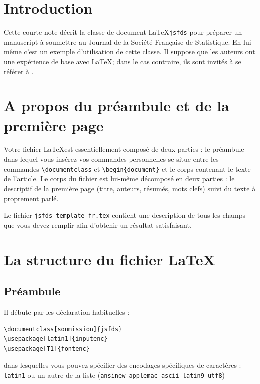 \documentclass[soumission]{jsfds}
\begin{document}
\begin{frontmatter}
  \begin{motscles}
  \end{motscles}

  \begin{motsclesalter}
  \end{motsclesalter}
  
  \begin{AMSclass}
  \end{AMSclass}
 
\end{frontmatter}
\section{Introduction}
Cette courte note décrit la classe de document \LaTeX \texttt{jsfds} pour préparer un manuscript à soumettre au Journal de la Société Française de Statistique. En lui-même c'est un exemple d'utilisation de cette classe. Il suppose que les auteurs ont une expérience de base avec \LaTeX ; dans le cas contraire, ils sont invités à se référer à \cite{lam94}.

\section{A propos du préambule et de la première page}
Votre fichier \LaTeX est essentiellement composé de deux parties : le préambule dans lequel vous insérez vos commandes personnelles se situe entre les commandes \verb+\documentclass+ et \verb+\begin{document}+ et le corps contenant le texte de l'article. Le corps du fichier est lui-même décomposé en deux parties : le descriptif de la première page (titre, auteurs, résumés, mots clefs) suivi du texte à proprement parlé. 

Le fichier \verb+jsfds-template-fr.tex+ contient une description de tous les champs que vous devez remplir afin d'obtenir un résultat satisfaisant.

\section{La structure du fichier \LaTeX}
\subsection{Préambule}
Il débute par les déclaration habituelles :
\begin{verbatim}
\documentclass[soumission]{jsfds}
\usepackage[latin1]{inputenc}
\usepackage[T1]{fontenc}
\end{verbatim}
dans lesquelles vous pouvez spécifier des encodages spécifiques de caractères : \verb+latin1+ ou un autre de la liste (\verb+ansinew applemac ascii latin9 utf8+)
\end{document}
